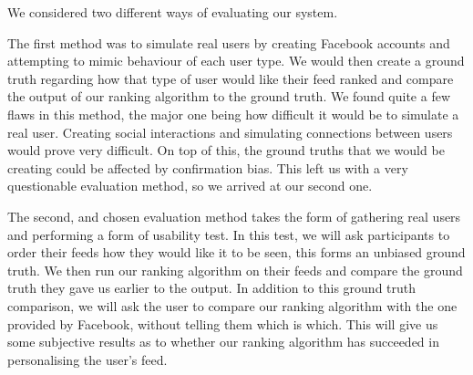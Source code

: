 We considered two different ways of evaluating our system.

The first method was to simulate real users by creating Facebook accounts and attempting to mimic behaviour of each user type. We would then create a ground truth regarding how that type of user would like their feed ranked and compare the output of our ranking algorithm to the ground truth. We found quite a few flaws in this method, the major one being how difficult it would be to simulate a real user. Creating social interactions and simulating connections between users would prove very difficult. On top of this, the ground truths that we would be creating could be affected by confirmation bias. This left us with a very questionable evaluation method, so we arrived at our second one.

The second, and chosen evaluation method takes the form of gathering real users and performing a form of usability test. In this test, we will ask participants to order their feeds how they would like it to be seen, this forms an unbiased ground truth. We then run our ranking algorithm on their feeds and compare the ground truth they gave us earlier to the output. In addition to this ground truth comparison, we will ask the user to compare our ranking algorithm with the one provided by Facebook, without telling them which is which. This will give us some subjective results as to whether our ranking algorithm has succeeded in personalising the user's feed.